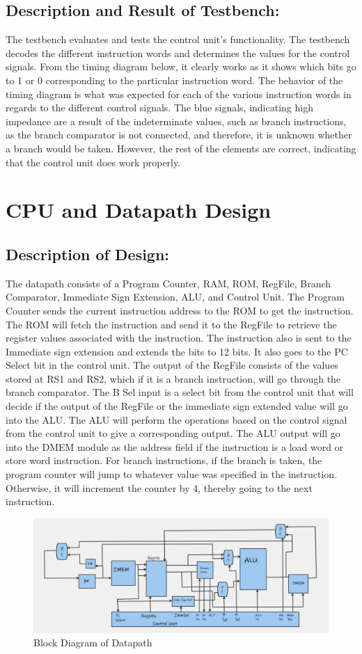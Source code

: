 \documentclass[10pt,letterpaper]{article}
\begin{document}
\subsection{Description and Result of Testbench:}
The testbench evaluates and tests the control unit’s functionality. The testbench decodes the different instruction words and determines the values for the control signals. From the timing diagram below, it clearly works as it shows which bits go to 1 or 0 corresponding to the particular instruction word. The behavior of the timing diagram is what was expected for each of the various instruction words in regards to the different control signals. The blue signals, indicating high impedance are a result of the indeterminate values, such as branch instructions, as the branch comparator is not connected, and therefore, it is unknown whether a branch would be taken. However, the rest of the elements are correct, indicating that the control unit does work properly.

\newpage
\section{CPU and Datapath Design}
\subsection{Description of Design:}
The datapath consists of a Program Counter, RAM, ROM, RegFile, Branch Comparator, Immediate Sign Extension, ALU, and Control Unit. The Program Counter sends the current instruction address to the ROM to get the instruction. The ROM will fetch the instruction and send it to the RegFile to retrieve the register values associated with the instruction. The instruction also is sent to the Immediate sign extension and extends the bits to 12 bits. It also goes to the PC Select bit in the control unit. The output of the RegFile consists of the values stored at RS1 and RS2, which if it is a branch instruction, will go through the branch comparator. The B Sel input is a select bit from the control unit that will decide if the output of the RegFile or the immediate sign extended value will go into the ALU. The ALU will perform the operations based on the control signal from the control unit to give a corresponding output. The ALU output will go into the DMEM module as the address field if the instruction is a load word or store word instruction. For branch instructions, if the branch is taken, the program counter will jump to whatever value was specified in the instruction. Otherwise, it will increment the counter by 4, thereby going to the next instruction.
\begin{figure}[H]
	\centering
	\includegraphics[width=0.7\linewidth]{Figures/DatapathDesign}
	\caption{Block Diagram of Datapath}
	\label{fig:datapathdesign}
\end{figure}
\end{document}
